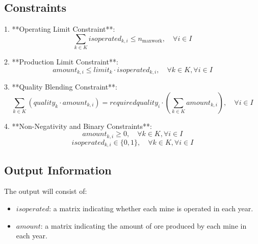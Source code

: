 \documentclass{article}
\begin{document}
\subsection*{Constraints}
1. **Operating Limit Constraint**:
   \[
   \sum_{k \in K} isoperated_{k,i} \leq n_{\text{maxwork}}, \quad \forall i \in I
   \]

2. **Production Limit Constraint**:
   \[
   amount_{k,i} \leq limit_k \cdot isoperated_{k,i}, \quad \forall k \in K, \forall i \in I
   \]

3. **Quality Blending Constraint**:
   \[
   \sum_{k \in K} (quality_k \cdot amount_{k,i}) = requiredquality_i \cdot \left( \sum_{k \in K} amount_{k,i} \right), \quad \forall i \in I
   \]

4. **Non-Negativity and Binary Constraints**:
   \[
   amount_{k,i} \geq 0, \quad \forall k \in K, \forall i \in I
   \]
   \[
   isoperated_{k,i} \in \{0, 1\}, \quad \forall k \in K, \forall i \in I
   \]

\subsection*{Output Information}
The output will consist of:
\begin{itemize}
    \item \( isoperated \): a matrix indicating whether each mine is operated in each year.
    \item \( amount \): a matrix indicating the amount of ore produced by each mine in each year.
\end{itemize}
\end{document}
